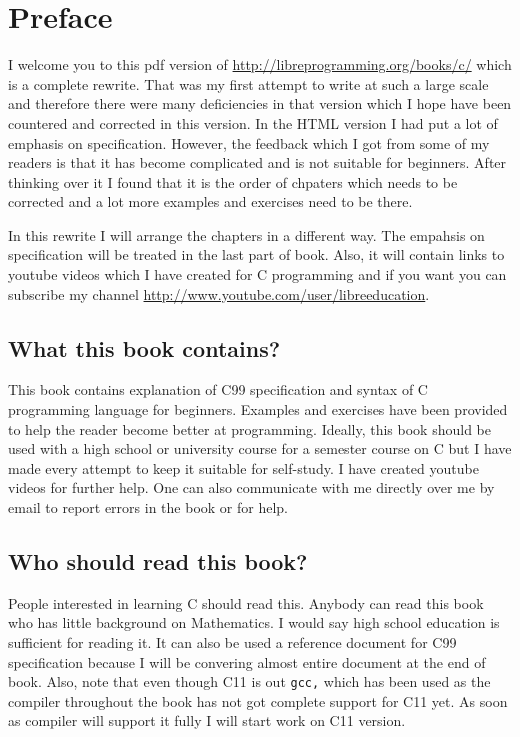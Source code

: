 \chapter{Preface}
I welcome you to this pdf version of 
\url{http://libreprogramming.org/books/c/} which is a complete rewrite. That 
was my first attempt to write at such a large scale and therefore there were 
many deficiencies in that version which I hope have been countered and
corrected in this version. In the HTML version I had put a lot of emphasis on 
specification. However, the feedback which I got from some of my readers is 
that it has become complicated and is not suitable for beginners. After 
thinking over it I found that it is the order of chpaters which needs to be 
corrected and a lot more examples and exercises need to be there.

In this rewrite I will arrange the chapters in a different way. The empahsis on 
specification will be treated in the last part of book. Also, it will contain 
links to youtube videos which I have created for C programming and if you want 
you can subscribe my channel \url{http://www.youtube.com/user/libreeducation}.

\section{What this book contains?}
This book contains explanation of C99 specification and syntax of C programming
language for beginners. Examples and exercises have been provided to help the
reader become better at programming. Ideally, this book should be used with a
high school or university course for a semester course on C but I have made
every attempt to keep it suitable for self-study. I have created youtube videos
for further help. One can also communicate with me directly over me by email to
report errors in the book or for help.

\section{Who should read this book?}
People interested in learning C should read this. Anybody can read this book
who has little background on Mathematics. I would say high school education is
sufficient for reading it. It can also be used a reference document for C99
specification because I will be convering almost entire document at the end of
book. Also, note that even though C11 is out \texttt{gcc,} which has been used
as the compiler throughout the book has not got complete support for C11
yet. As soon as compiler will support it fully I will start work on C11
version.

